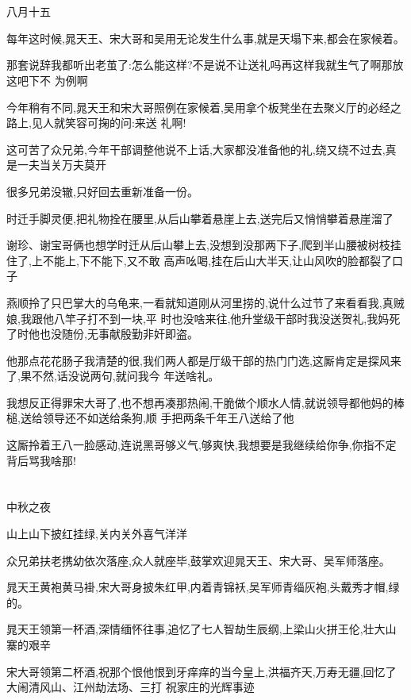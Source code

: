 ﻿\documentclass[12pt]{article}
\begin{document}
\section{}

八月十五

每年这时候,晁天王、宋大哥和吴用无论发生什么事,就是天塌下来,都会在家候着。

那套说辞我都听出老茧了:怎么能这样?不是说不让送礼吗\dldots 再这样我就生气了啊\dldots 那放这吧\dldots 下不
为例啊\dldots

今年稍有不同,晁天王和宋大哥照例在家候着,吴用拿个板凳坐在去聚义厅的必经之路上,见人就笑容可掬的问:来送
礼啊!

这可苦了众兄弟,今年干部调整他说不上话,大家都没准备他的礼,绕又绕不过去,真是一夫当关万夫莫开

很多兄弟没辙,只好回去重新准备一份。

时迁手脚灵便,把礼物拴在腰里,从后山攀着悬崖上去,送完后又悄悄攀着悬崖溜了

谢珍、谢宝哥俩也想学时迁从后山攀上去,没想到没那两下子,爬到半山腰被树枝挂住了,上不能上,下不能下,又不敢
高声吆喝,挂在后山大半天,让山风吹的脸都裂了口子

燕顺拎了只巴掌大的乌龟来,一看就知道刚从河里捞的,说什么过节了来看看我,真贼娘,我跟他八竿子打不到一块,平
时也没啥来往,他升堂级干部时我没送贺礼,我妈死了时他也没随份,无事献殷勤非奸即盗。

他那点花花肠子我清楚的很,我们两人都是厅级干部的热门门选,这厮肯定是探风来了,果不然,话没说两句,就问我今
年送啥礼。

我想反正得罪宋大哥了,也不想再凑那热闹,干脆做个顺水人情,就说领导都他妈的棒槌,送给领导还不如送给条狗,顺
手把两条千年王八送给了他

这厮拎着王八一脸感动,连说黑哥够义气,够爽快,我想要是我继续给你争,你指不定背后骂我啥那!

\section{}

中秋之夜

山上山下披红挂绿,关内关外喜气洋洋

众兄弟扶老携幼依次落座,众人就座毕,鼓掌欢迎晁天王、宋大哥、吴军师落座。

晁天王黄袍黄马褂,宋大哥身披朱红甲,内着青锦袄,吴军师青缁灰袍,头戴秀才帽,绿的。

晁天王领第一杯酒,深情缅怀往事,追忆了七人智劫生辰纲,上梁山火拼王伦,壮大山寨的艰辛\dldots

宋大哥领第二杯酒,祝那个恨他恨到牙痒痒的当今皇上,洪福齐天,万寿无疆,回忆了大闹清风山、江州劫法场、三打
祝家庄的光辉事迹\dldots
\end{document}
